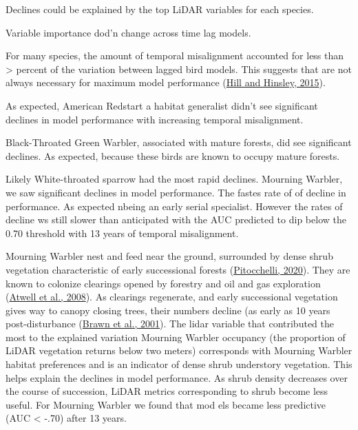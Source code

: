 \documentclass[
]{article}
\begin{document}
Declines could be explained by the top LiDAR variables for each species.

Variable importance dod'n change across time lag models.

For many species, the amount of temporal misalignment accounted for less than \textgreater{} percent of the variation between lagged bird models. This suggests that are not always necessary for maximum model performance (\protect\hyperlink{ref-hillAirborneLidarWoodland2015}{Hill and Hinsley, 2015}).

As expected, American Redstart a habitat generalist didn't see significant declines in model performance with increasing temporal misalignment.

Black-Throated Green Warbler, associated with mature forests, did see significant declines. As expected, because these birds are known to occupy mature forests.

Likely White-throated sparrow had the most rapid declines.
Mourning Warbler, we saw significant declines in model performance. The fastes rate of of decline in performance. As expected nbeing an early serial specialist. However the rates of decline ws still slower than anticipated with the AUC predicted to dip below the 0.70 threshold with 13 years of temporal misalignment.

Mourning Warbler nest and feed near the ground, surrounded by dense shrub vegetation characteristic of early successional forests (\protect\hyperlink{ref-pitocchelliMourningWarblerGeothlypis2020}{Pitocchelli, 2020}). They are known to colonize clearings opened by forestry and oil and gas exploration (\protect\hyperlink{ref-atwellSongbirdResponseExperimental2008}{Atwell et al., 2008}). As clearings regenerate, and early successional vegetation gives way to canopy closing trees, their numbers decline (as early as 10 years post-disturbance (\protect\hyperlink{ref-brawnRoleDisturbanceEcology2001}{Brawn et al., 2001}). The lidar variable that contributed the most to the explained variation Mourning Warbler occupancy (the proportion of LiDAR vegetation returns below two meters) corresponds with Mourning Warbler habitat preferences and is an indicator of dense shrub understory vegetation. This helps explain the declines in model performance. As shrub density decreases over the course of succession, LiDAR metrics corresponding to shrub become less useful. For Mourning Warbler we found that mod
els became less predictive (AUC \textless{} -.70) after 13 years.
\end{document}
